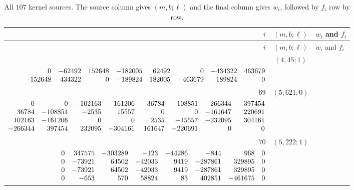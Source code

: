 \documentclass[11pt]{article}
\theoremstyle{remark}
\numberwithin{equation}{section}
\begin{document}
\clearpage
\begingroup
\footnotesize
\setlength{\tabcolsep}{2pt}
\setlength{\arraycolsep}{1.5pt}
\renewcommand{\arraystretch}{1.05}
\begin{longtable}{rcl}
\caption{All $107$ kernel sources. The source column gives $(m,b;\ell)$ and the final column gives $w_i$, followed by $f_i$ row by row.}\label{tab:405-kerneldata}\\
\toprule
$i$&$(m,b;\ell)$&$w_i$ and $f_i$\\\midrule
\endfirsthead
\toprule
$i$&$(m,b;\ell)$&$w_i$ and $f_i$\\\midrule
\endhead
\bottomrule\endfoot
68 & $(4,45;1)$ & \begin{tabular}[t]{@{}l@{}}$w_i=\displaystyle \frac{35565071516699134399}{1318905881618234860000000000000000000}$\\[3pt]{\scriptsize$\begin{array}{@{}rrrrrrrr@{}}0 & -62492 & 152648 & -182005 & 62492 & 0 & -434322 & 463679\\-152648 & 434322 & 0 & -189824 & 182005 & -463679 & 189824 & 0\end{array}$}\end{tabular}\\[8pt]
69 & $(5,621;0)$ & \begin{tabular}[t]{@{}l@{}}$w_i=\displaystyle \frac{8182262002905589}{7117363909909680000000000000000000}$\\[3pt]{\scriptsize$\begin{array}{@{}rrrrrrrr@{}}0 & 0 & -102163 & 161206 & -36784 & 108851 & 266344 & -397454\\36784 & -108851 & -2535 & 15557 & 0 & 0 & -161647 & 220691\\102163 & -161206 & 0 & 0 & 2535 & -15557 & -232095 & 304161\\-266344 & 397454 & 232095 & -304161 & 161647 & -220691 & 0 & 0\end{array}$}\end{tabular}\\[8pt]
70 & $(5,222;1)$ & \begin{tabular}[t]{@{}l@{}}$w_i=\displaystyle \frac{6159739329383990367}{7328885380069263538400000000000000000}$\\[3pt]{\scriptsize$\begin{array}{@{}rrrrrrrr@{}}0 & 347575 & -303289 & -123 & -44286 & -844 & 968 & 0\\0 & -73921 & 64502 & -42033 & 9419 & -287861 & 329895 & 0\\0 & -73921 & 64502 & -42033 & 9419 & -287861 & 329895 & 0\\0 & -653 & 570 & 58824 & 83 & 402851 & -461675 & 0\end{array}$}\end{tabular}\\[8pt]

\end{longtable}
\end{document}
